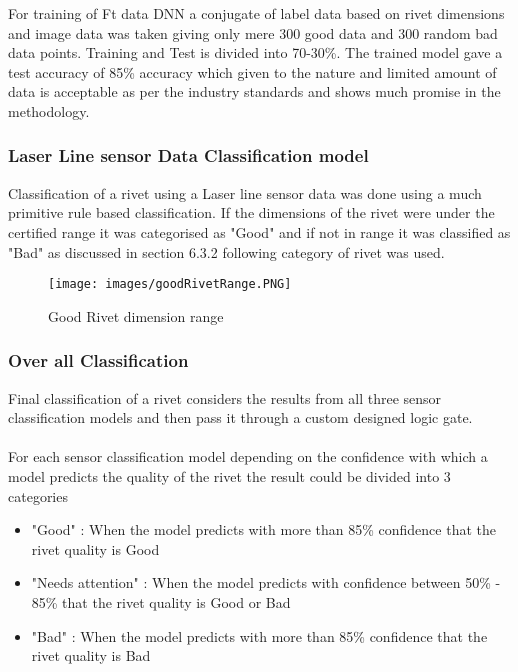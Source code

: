 \documentclass{article}
\begin{document}
For training of Ft data DNN a conjugate of label data based on rivet dimensions and image data was taken giving only mere 300 good data and 300 random bad data points. Training and Test is divided into 70-30\%. The trained model gave a test accuracy of 85\% accuracy which given to the nature and limited amount of data is acceptable as per the industry standards and shows much promise in the methodology.

\subsubsection{Laser Line sensor Data Classification model}

Classification of a rivet using a Laser line sensor data was done using a much primitive rule based classification. If the dimensions of the rivet were under the certified range it was categorised as "Good" and if not in range it was classified as "Bad" as discussed in section 6.3.2 following category of rivet was used.

\begin{figure}[H]
    \centering
    \texttt{[image: images/goodRivetRange.PNG]}
    \caption{Good Rivet dimension range}
    \label{fig:goodRivetRange}
\end{figure}


\subsubsection{Over all Classification}

Final classification of a rivet considers the results from all three sensor classification models and then pass it through a custom designed logic gate. \\\\
For each sensor classification model depending on the confidence with which a model predicts the quality of the rivet the result could be divided into 3 categories 

\begin{itemize}
    \item "Good" : When the model predicts with more than 85\% confidence that the rivet quality is Good
    \item "Needs attention" :  When the model predicts with confidence between 50\% - 85\% that the rivet quality is Good or Bad
    \item "Bad" : When the model predicts with more than 85\% confidence that the rivet quality is Bad
\end{itemize}
\end{document}
